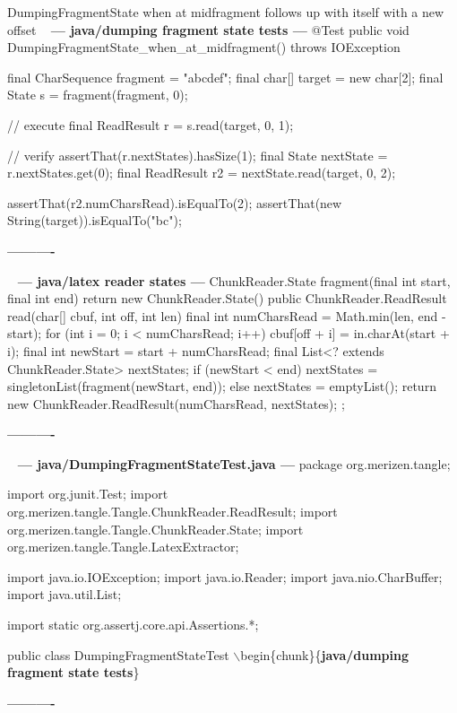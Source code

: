 \documentclass{book}
\newenvironment{chunk}[1]{%
{\ }\newline\noindent%
\hbox{\hskip 2.0cm}{\bf --- #1 ---}%
\verbatim}%                               say exactly what we see
{\endverbatim%
\par{}%
\noindent{}%
\hbox{\hskip 2.0cm}{\bf ----------}%
\par%
\normalsize\noindent}%
\providecommand{\getchunk}[1]{%
\noindent%
{\small $\backslash{}$begin\{chunk\}\{{\bf #1}\}}%
\index{{#1}}}
\begin{document}
DumpingFragmentState when at midfragment follows up with itself with a new offset
\begin{chunk}{java/dumping fragment state tests}
@Test
public void DumpingFragmentState_when_at_midfragment() throws IOException {
    final CharSequence fragment = "abcdef";
    final char[] target = new char[2];
    final State s = fragment(fragment, 0);

    // execute
    final ReadResult r = s.read(target, 0, 1);

    // verify
    assertThat(r.nextStates).hasSize(1);
    final State nextState = r.nextStates.get(0);
    final ReadResult r2 = nextState.read(target, 0, 2);

    assertThat(r2.numCharsRead).isEqualTo(2);
    assertThat(new String(target)).isEqualTo("bc");
}
\end{chunk}

\begin{chunk}{java/latex reader states}
ChunkReader.State fragment(final int start, final int end) {
    return new ChunkReader.State() {
        public ChunkReader.ReadResult read(char[] cbuf, int off, int len) {
            final int numCharsRead = Math.min(len, end - start);
            for (int i = 0; i < numCharsRead; i++) {
                cbuf[off + i] = in.charAt(start + i);
            }
            final int newStart = start + numCharsRead;
            final List<? extends ChunkReader.State> nextStates;
            if (newStart < end) {
                nextStates = singletonList(fragment(newStart, end));
            } else {
                nextStates = emptyList();
            }
            return new ChunkReader.ReadResult(numCharsRead, nextStates);
        }
    };
}
\end{chunk}

\begin{chunk}{java/DumpingFragmentStateTest.java}
package org.merizen.tangle;

import org.junit.Test;
import org.merizen.tangle.Tangle.ChunkReader.ReadResult;
import org.merizen.tangle.Tangle.ChunkReader.State;
import org.merizen.tangle.Tangle.LatexExtractor;

import java.io.IOException;
import java.io.Reader;
import java.nio.CharBuffer;
import java.util.List;

import static org.assertj.core.api.Assertions.*;

public class DumpingFragmentStateTest {
\getchunk{java/dumping fragment state tests}
}
\end{chunk}
\end{document}
